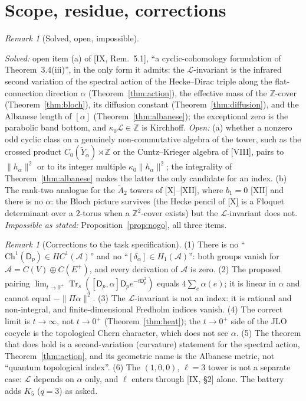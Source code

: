 \documentclass[11pt]{amsart}
\numberwithin{equation}{section}
\theoremstyle{definition}
\theoremstyle{remark}
\newtheorem{remark}[theorem]{Remark}
\newcommand{\Z}{\mathbb{Z}}
\newcommand{\cA}{\mathcal{A}}
\newcommand{\cL}{\mathcal{L}}
\newcommand{\Dp}{\mathsf{D}_p}
\newcommand{\Trs}{\operatorname{Tr}_s}
\newcommand{\HC}{\mathit{HC}}
\begin{document}
\section{Scope, residue, corrections}\label{sec:scope}

\begin{remark}[Solved, open, impossible]\label{rem:scope}
\begin{sloppypar}
\emph{Solved:} open item (a) of [IX, Rem.~5.1], ``a cyclic-cohomology formulation of
Theorem~3.4(iii)'', in the only form it admits: the $\cL$-invariant is the infrared second
variation of the spectral action of the Hecke--Dirac triple along the flat-connection
direction $\alpha$ (Theorem~\ref{thm:action}), the effective mass of the $\Z$-cover
(Theorem~\ref{thm:bloch}), its diffusion constant (Theorem~\ref{thm:diffusion}), and the
Albanese length of $[\alpha]$ (Theorem~\ref{thm:albanese}); the exceptional zero is the
parabolic band bottom, and $\kappa_0\cL\in\Z$ is Kirchhoff. \emph{Open:} (a) whether a
nonzero odd cyclic class on a genuinely non-commutative algebra of the tower, such as the
crossed product $C_0(\widetilde Y_\alpha)\rtimes\Z$ or the Cuntz--Krieger algebra of [VIII],
pairs to $\|h_\alpha\|^{2}$ or to its integer multiple $\kappa_0\|h_\alpha\|^{2}$; the
integrality of Theorem~\ref{thm:albanese} makes the latter the only candidate for an index.
(b) The rank-two analogue for the $\widetilde A_2$ towers of [X]--[XII], where $b_1=0$ [XII]
and there is no $\alpha$: the Bloch picture survives (the Hecke pencil of [X] is a Floquet
determinant over a $2$-torus when a $\Z^{2}$-cover exists) but the $\cL$-invariant does not.
\emph{Impossible as stated:} Proposition~\ref{prop:nogo}, all three items.
\end{sloppypar}
\end{remark}

\begin{remark}[Corrections to the task specification]\label{rem:corrections}
(1) There is no ``$\mathrm{Ch}^{1}(\Dp)\in\HC^{1}(\cA)$'' and no ``$[\delta_\alpha]\in H_1(\cA)$'':
both groups vanish for $\cA=C(V)\oplus C(E^{+})$, and every derivation of $\cA$ is zero.
(2) The proposed pairing $\lim_{t\to0^{+}}\Trs([\Dp,\alpha]\Dp e^{-t\Dp^{2}})$ equals
$4\sum_e\alpha(e)$; it is linear in $\alpha$ and cannot equal $-\|\Pi\alpha\|^{2}$. (3) The
$\cL$-invariant is not an index: it is rational and non-integral, and finite-dimensional
Fredholm indices vanish. (4) The correct limit is $t\to\infty$, not $t\to0^{+}$
(Theorem~\ref{thm:heat}); the $t\to0^{+}$ side of the JLO cocycle is the topological Chern
character, which does not see $\alpha$. (5) The theorem that does hold is a second-variation
(curvature) statement for the spectral action, Theorem~\ref{thm:action}, and its
geometric name is the Albanese metric, not ``quantum topological index''. (6) The
$(1,0,0)$, $\ell=3$ tower is not a separate case: $\cL$ depends on $\alpha$ only, and
$\ell$ enters through [IX, \S2] alone. The battery adds $K_5$ ($q=3$) as asked.
\end{remark}
\end{document}

